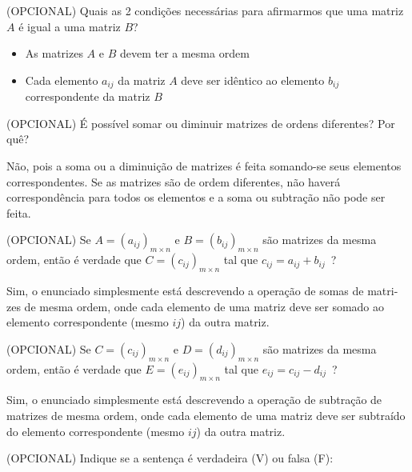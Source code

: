 \documentclass[pdftex, brazil, 12pt, oneside, addpoints]{exam}
\newcommand{\vf}[1][{}]{%
  \fillin[#1][0.25in]%
}
\begin{document}
\begin{questions}
\question
(OPCIONAL) Quais as 2 condições necessárias para afirmarmos que uma matriz $A$ é igual a uma matriz $B$?
\begin{solution}
  \begin{itemize}
  \vspace{-0.5cm}
  \item As matrizes $A$ e $B$ devem ter a mesma ordem
  \item Cada elemento $a_{ij}$ da matriz $A$ deve ser idêntico ao elemento
    $b_{ij}$ correspondente da matriz $B$
  \end{itemize}
\end{solution}

\question
(OPCIONAL) É possível somar ou diminuir matrizes de ordens diferentes? Por quê?
\begin{solution}
  Não, pois a soma ou a diminuição de matrizes é feita somando-se seus
  elementos correspondentes. Se as matrizes são de ordem diferentes, não
  haverá correspondência para todos os elementos e a soma ou subtração
  não pode ser feita.
\end{solution}

\question
(OPCIONAL) Se $A = (a_{ij})_{m \times n}$ e $B = (b_{ij})_{m \times n}$ são matrizes
da mesma ordem, então é verdade que $C = (c_{ij})_{m \times n}$ tal que
$c_{ij} = a_{ij} + b_{ij}$\ ?
\begin{solution}
  Sim, o enunciado simplesmente está descrevendo a operação de somas de matri-zes
  de mesma ordem, onde cada elemento de uma matriz deve ser somado ao elemento
  correspondente (mesmo $ij$) da outra matriz.
\end{solution}

\question
(OPCIONAL) Se $C = (c_{ij})_{m \times n}$ e $D = (d_{ij})_{m \times n}$ são matrizes
da mesma ordem, então é verdade que $E = (e_{ij})_{m \times n}$ tal que
$e_{ij} = c_{ij} - d_{ij}$\ ?
\begin{solution}
  Sim, o enunciado simplesmente está descrevendo a operação de subtração de matrizes
  de mesma ordem, onde cada elemento de uma matriz deve ser subtraído do elemento
  correspondente (mesmo $ij$) da outra matriz.
\end{solution}

\question
(OPCIONAL) Indique se a sentença é verdadeira (V) ou falsa (F):
\end{questions}
\end{document}

